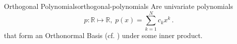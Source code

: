 \begin{definition}{Orthogonal Polynomials}{orthogonal-polynomials}
  Are univariate polynomials
  \[p: \mathbb{R} \mapsto \mathbb{R}, \; p(x) = \sum_{k=1}^N c_k x^k\,.\]
  that form an Orthonormal Basis (cf. ) under some inner product.
\end{definition}
